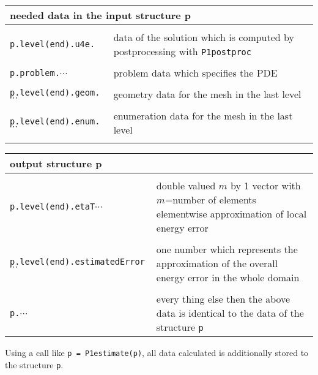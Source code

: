 \begin{longtable}[h]{p{5.5cm}p{6cm}}

\multicolumn{2}{l}{needed data in the input structure p}\\\hline\\[-1ex]

\verb+p.level(end).u4e.+
&data of the solution which is computed by postprocessing with \verb+P1postproc+ \\
\\
\verb+p.problem.+$\cdots$
&problem data which specifies the PDE\\
\\
\verb+p.level(end).geom.+$\cdots$
&geometry data for the mesh in the last level\\
\\
\verb+p.level(end).enum.+$\cdots$
&enumeration data for the mesh in the last level\\
\\
\end{longtable}

\begin{longtable}[h]{p{5.5cm}p{6cm}}
\multicolumn{2}{l}{output structure p}\\\hline\\[-1ex]

\verb+p.level(end).etaT+$\cdots$ 
& double valued $m$ by 1 vector with $m$=number of elements elementwise approximation of local energy error\\
\\
\verb+p.level(end).estimatedError+$\cdots$
& one number which represents the approximation of the overall energy error in the whole domain\\
\\
\verb+p.+$\cdots$
& every thing else then the above data is identical to the data of the structure \verb+p+
\end{longtable}

\noindent Using a call like \verb+p = P1estimate(p)+, all data calculated is additionally stored to the structure \verb+p+.